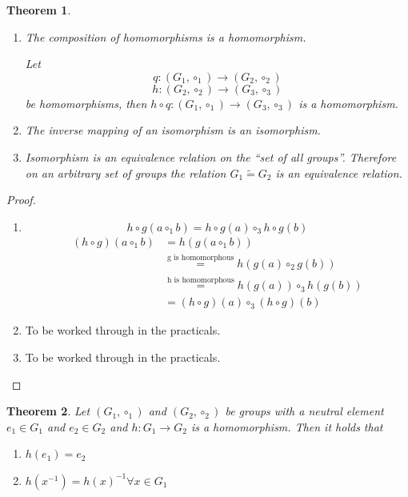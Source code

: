 \documentclass[a4paper,landscape,twocolumn]{article}
\newtheorem{theorem}{Theorem}
\begin{document}
\begin{theorem}
  \begin{enumerate}
    \item
      The composition of homomorphisms is a homomorphism.

      Let
      \[ q: (G_1, \circ_1) \rightarrow (G_2, \circ_2) \]
      \[ h: (G_2, \circ_2) \rightarrow (G_3, \circ_3) \]
      be homomorphisms, then $h \circ q: (G_1, \circ_1) \rightarrow (G_3, \circ_3)$
      is a homomorphism.

    \item
      The inverse mapping of an isomorphism is an isomorphism.
    \item
      Isomorphism is an equivalence relation on the \enquote{set of all groups}.
      Therefore on an arbitrary set of groups the relation
      $G_1 \tilde{=} G_2$ is an equivalence relation.
  \end{enumerate}
\end{theorem}

\begin{proof}
  \begin{enumerate}
    \item
      \[ h \circ g(a \circ_1 b) = h \circ g(a) \circ_3 h\circ g(b) \]
      \begin{align*}
        (h \circ g)(a \circ_1 b) &= h(g(a \circ_1 b)) \\
            &\stackrel{\text{g is homomorphous}}{=} h(g(a) \circ_2 g(b)) \\
            &\stackrel{\text{h is homomorphous}}{=} h(g(a)) \circ_3 h(g(b)) \\
            &= (h \circ g)(a) \circ_3 (h \circ g)(b)
      \end{align*}
    \item To be worked through in the practicals.
    \item To be worked through in the practicals.
  \end{enumerate}
\end{proof}

\begin{theorem}
  Let $(G_1, \circ_1)$ and $(G_2, \circ_2)$ be groups with a neutral element
  $e_1 \in G_1$ and $e_2 \in G_2$ and $h: G_1 \rightarrow G_2$ is a homomorphism.
  Then it holds that
  \begin{enumerate}
    \item $h(e_1) = e_2$
    \item $h(x^{-1}) = h(x)^{-1} \forall x \in G_1$
  \end{enumerate}
\end{theorem}
\end{document}
